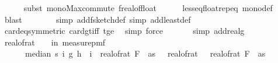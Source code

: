 \begin{isabellebody}
\ \ \ \ \isamarkupfalse%
\ {\isacharparenleft}{\kern0pt}subst\ mono{\isacharunderscore}{\kern0pt}Max{\isacharunderscore}{\kern0pt}commute{\isacharbrackleft}{\kern0pt}\ f{\isacharequal}{\kern0pt}{\isachardoublequoteopen}real{\isacharunderscore}{\kern0pt}of{\isacharunderscore}{\kern0pt}float{\isachardoublequoteclose}{\isacharbrackright}{\kern0pt}{\isacharparenright}{\kern0pt}\isanewline
\ \ \ \ \isamarkupfalse%
\ less{\isacharunderscore}{\kern0pt}eq{\isacharunderscore}{\kern0pt}float{\isachardot}{\kern0pt}rep{\isacharunderscore}{\kern0pt}eq\ mono{\isacharunderscore}{\kern0pt}def\ \isamarkupfalse%
\ blast\isanewline
\ \ \ \ \ \ \isamarkupfalse%
\ {\isacharparenleft}{\kern0pt}simp\ add{\isacharcolon}{\kern0pt}f{}{\isacharunderscore}{\kern0pt}sketch{\isacharunderscore}{\kern0pt}def{\isacharcomma}{\kern0pt}\ simp\ add{\isacharcolon}{\kern0pt}least{\isacharunderscore}{\kern0pt}def{\isacharparenright}{\kern0pt}\isanewline
\ \ \ \ \isamarkupfalse%
\ card{\isacharunderscore}{\kern0pt}eq{\isacharbrackleft}{\kern0pt}symmetric{\isacharbrackright}{\kern0pt}\ card{\isacharunderscore}{\kern0pt}gt{\isacharunderscore}{\kern0pt}{}{\isacharunderscore}{\kern0pt}iff\ t{\isacharunderscore}{\kern0pt}ge{\isacharunderscore}{\kern0pt}{}\ \isamarkupfalse%
\ {\isacharparenleft}{\kern0pt}simp{\isacharcomma}{\kern0pt}\ force{\isacharparenright}{\kern0pt}\ \isanewline
\ \ \ \ \isamarkupfalse%
\ {\isacharparenleft}{\kern0pt}simp\ add{\isacharcolon}{\kern0pt}real{\isacharunderscore}{\kern0pt}g{\isacharunderscore}{\kern0pt}{}{\isacharparenright}{\kern0pt}\isanewline
\ \isanewline
\ \ \isamarkupfalse%
\ {\isachardoublequoteopen}{}{\isacharminus}{\kern0pt}real{\isacharunderscore}{\kern0pt}of{\isacharunderscore}{\kern0pt}rat\ {\isasymepsilon}\ {\isasymle}\ {\isasymP}{\isacharparenleft}{\kern0pt}{\isasymomega}\ in\ measure{\isacharunderscore}{\kern0pt}pmf\ {\isasymOmega}\isanewline
\ \ \ \ \ \ {\isasymbar}median\ s\ {\isacharparenleft}{\kern0pt}{\isasymlambda}i{\isachardot}{\kern0pt}\ g{\isacharprime}{\kern0pt}\ {\isacharparenleft}{\kern0pt}h\ {\isacharparenleft}{\kern0pt}{\isasymomega}\ i{\isacharparenright}{\kern0pt}{\isacharparenright}{\kern0pt}{\isacharparenright}{\kern0pt}\ {\isacharminus}{\kern0pt}\ real{\isacharunderscore}{\kern0pt}of{\isacharunderscore}{\kern0pt}rat\ {\isacharparenleft}{\kern0pt}F\ {}\ as{\isacharparenright}{\kern0pt}{\isasymbar}\ {\isasymle}\ \ real{\isacharunderscore}{\kern0pt}of{\isacharunderscore}{\kern0pt}rat\ {\isasymdelta}\ {\isacharasterisk}{\kern0pt}\ real{\isacharunderscore}{\kern0pt}of{\isacharunderscore}{\kern0pt}rat\ {\isacharparenleft}{\kern0pt}F\ {}\ as{\isacharparenright}{\kern0pt}{\isacharparenright}{\kern0pt}{\isachardoublequoteclose}\isanewline

\end{isabellebody}
